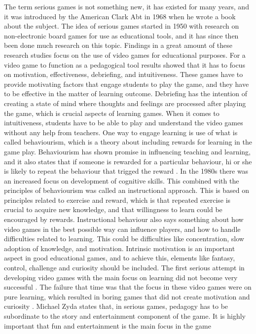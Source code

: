 The term serious games is not something new, it has existed for many years, and it was introduced by the American Clark Abt in 1968 when he wrote a book about the subject. The idea of serious games started in 1950 with research on non-electronic board games for use as educational tools, and it has since then been done much research on this topic. Findings in a great amount of these research studies focus on the use of video games for educational purposes. For a video game to function as a pedagogical tool results showed that it has to focus on motivation, effectiveness, debriefing, and intuitiveness. These games have to provide motivating factors that engage students to play the game, and they have to be effective in the matter of learning outcome. Debriefing has the intention of creating a state of mind where thoughts and feelings are processed after playing the game, which is crucial aspects of learning games. When it comes to intuitiveness, students have to be able to play and understand the video games without any help from teachers. One way to engage learning is use of what is called behaviourism, which is a theory about including rewards for learning in the game play. Behaviourism has shown promise in influencing teaching and learning, and it also states that if someone is rewarded for a particular behaviour, hi or she is likely to repeat the behaviour that trigged the reward \cite{behaviour}. In the 1980s there was an increased focus on development of cognitive skills. This combined with the principles of behaviourism was called an instructional approach. This is based on principles related to exercise and reward, which is that repeated exercise is crucial to acquire new knowledge, and that willingness to learn could be encouraged by rewards. Instructional behaviour also says something about how video games in the best possible way can influence players, and how to handle difficulties related to learning. This could be difficulties like concentration, slow adoption of knowledge, and motivation. Intrinsic motivation is an important aspect in good educational games, and to achieve this, elements like fantasy, control, challenge and curiosity should be included. The first serious attempt in developing video games with the main focus on learning did not become very successful \cite{understandingvg}. The failure that time was that the focus in these  video games were on pure learning, which resulted in boring games that did not create motivation and curiosity \cite{understandingvg} \cite{susi2007serious}. Michael Zyda states that, in serious games, pedagogy has to be subordinate to the story and entertainment component of the game. It is highly important that fun and entertainment is the main focus in the game \cite{zyda2005visual}

